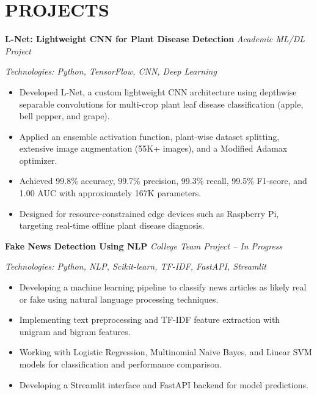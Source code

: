 \documentclass[10pt,a4paper]{article}
\newcommand{\projectHeading}[2]{
    \textbf{\color{heading}#1}
    \hfill
    \textit{#2}
}
\begin{document}

\section*{PROJECTS}

\projectHeading
{L-Net: Lightweight CNN for Plant Disease Detection}
{Academic ML/DL Project}

\textit{Technologies: Python, TensorFlow, CNN, Deep Learning}

\begin{itemize}
    \item Developed L-Net, a custom lightweight CNN architecture using depthwise separable convolutions for multi-crop plant leaf disease classification (apple, bell pepper, and grape).
    \item Applied an ensemble activation function, plant-wise dataset splitting, extensive image augmentation (55K+ images), and a Modified Adamax optimizer.
    \item Achieved 99.8\% accuracy, 99.7\% precision, 99.3\% recall, 99.5\% F1-score, and 1.00 AUC with approximately 167K parameters.
    \item Designed for resource-constrained edge devices such as Raspberry Pi, targeting real-time offline plant disease diagnosis.
\end{itemize}

\vspace{3pt}

\projectHeading
{Fake News Detection Using NLP}
{College Team Project -- In Progress}

\textit{Technologies: Python, NLP, Scikit-learn, TF-IDF, FastAPI, Streamlit}

\begin{itemize}
    \item Developing a machine learning pipeline to classify news articles as likely real or fake using natural language processing techniques.
    \item Implementing text preprocessing and TF-IDF feature extraction with unigram and bigram features.
    \item Working with Logistic Regression, Multinomial Naive Bayes, and Linear SVM models for classification and performance comparison.
    \item Developing a Streamlit interface and FastAPI backend for model predictions.
\end{itemize}
\end{document}
